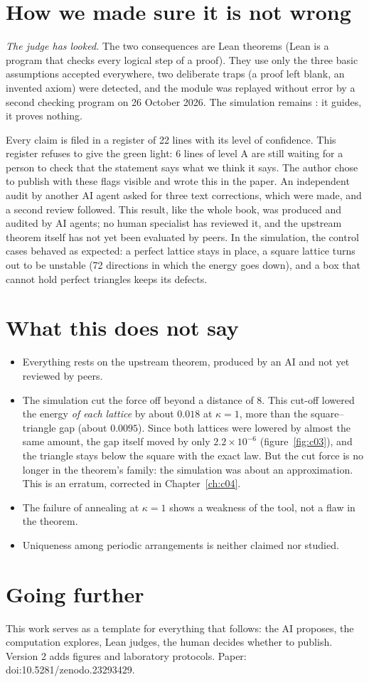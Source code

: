 \section*{How we made sure it is not wrong}

 \emph{The judge has looked.} The two consequences are Lean theorems (Lean is a program that checks every
logical step of a proof). They use only the three basic assumptions accepted everywhere, two deliberate traps (a proof
left blank, an invented axiom) were detected, and the module was replayed without error by a second checking program
on 26 October 2026. The simulation remains : it guides, it proves nothing.

Every claim is filed in a register of 22 lines with its level of confidence. This register refuses to give the green
light: 6 lines of level A are still waiting for a person to check that the statement says what we think it says. The
author chose to publish with these flags visible and wrote this in the paper. An independent audit by another AI agent
asked for three text corrections, which were made, and a second review followed. This result, like the whole book,
was produced and audited by AI agents; no human specialist has reviewed it, and the upstream theorem itself has not
yet been evaluated by peers. In the simulation, the control cases behaved as expected: a perfect lattice stays in
place, a square lattice turns out to be unstable (72 directions in which the energy goes down), and a box that cannot
hold perfect triangles keeps its defects.

\section*{What this does not say}

\begin{limite}
\begin{itemize}
\item Everything rests on the upstream theorem, produced by an AI and not yet reviewed by peers.
\item The simulation cut the force off beyond a distance of 8. This cut-off lowered the energy \emph{of each
lattice} by about $0.018$ at $\kappa=1$, more than the square--triangle gap (about $0.0095$). Since both lattices
were lowered by almost the same amount, the gap itself moved by only $2.2\times10^{-6}$ (figure~\ref{fig:c03}),
and the triangle stays below the square with the exact law. But the cut force is no longer in the theorem's
family: the simulation was about an approximation. This is an erratum, corrected in Chapter~\ref{ch:c04}.
\item The failure of annealing at $\kappa=1$ shows a weakness of the tool, not a flaw in the theorem.
\item Uniqueness among periodic arrangements is neither claimed nor studied.
\end{itemize}
\end{limite}

\section*{Going further}

This work serves as a template for everything that follows: the AI proposes, the computation explores, Lean judges,
the human decides whether to publish. Version 2 adds figures and laboratory protocols. Paper:
doi:10.5281/zenodo.23293429.
